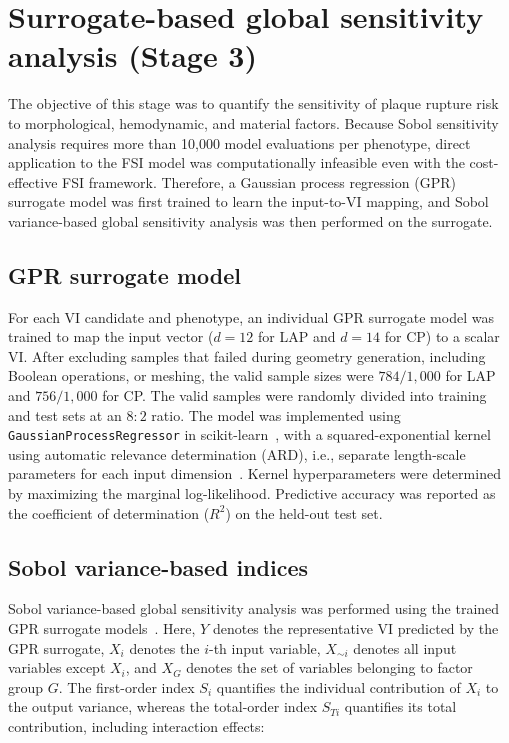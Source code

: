\documentclass[master,english,final]{kaist-ucs}
\begin{document}
\section{Surrogate-based global sensitivity analysis (Stage 3)}
The objective of this stage was to quantify the sensitivity of plaque rupture risk to morphological, hemodynamic, and material factors. Because Sobol sensitivity analysis requires more than 10{,}000 model evaluations per phenotype, direct application to the FSI model was computationally infeasible even with the cost-effective FSI framework. Therefore, a Gaussian process regression (GPR) surrogate model was first trained to learn the input-to-VI mapping, and Sobol variance-based global sensitivity analysis was then performed on the surrogate.

\subsection{GPR surrogate model}
For each VI candidate and phenotype, an individual GPR surrogate model was trained to map the input vector ($d=12$ for LAP and $d=14$ for CP) to a scalar VI. After excluding samples that failed during geometry generation, including Boolean operations, or meshing, the valid sample sizes were $784/1{,}000$ for LAP and $756/1{,}000$ for CP. The valid samples were randomly divided into training and test sets at an $8\!:\!2$ ratio. The model was implemented using \texttt{GaussianProcessRegressor} in scikit-learn~\cite{pedregosa2011scikit}, with a squared-exponential kernel using automatic relevance determination (ARD), i.e., separate length-scale parameters for each input dimension~\cite{rasmussen2006gpml}. Kernel hyperparameters were determined by maximizing the marginal log-likelihood. Predictive accuracy was reported as the coefficient of determination ($R^2$) on the held-out test set.

\subsection{Sobol variance-based indices}
Sobol variance-based global sensitivity analysis was performed using the trained GPR surrogate models~\cite{sobol2001global, saltelli2002sobol, saltelli2010variance}. Here, $Y$ denotes the representative VI predicted by the GPR surrogate, $X_i$ denotes the $i$-th input variable, $X_{\sim i}$ denotes all input variables except $X_i$, and $X_G$ denotes the set of variables belonging to factor group $G$. The first-order index $S_i$ quantifies the individual contribution of $X_i$ to the output variance, whereas the total-order index $S_{Ti}$ quantifies its total contribution, including interaction effects:
\end{document}
